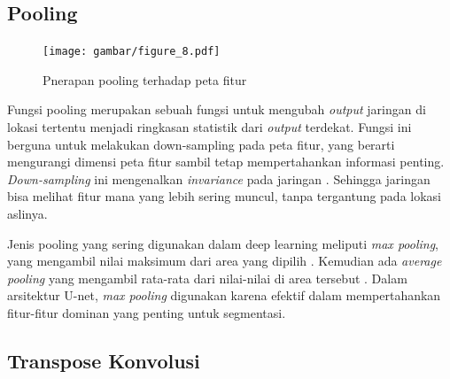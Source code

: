 \subsection{Pooling}

\begin{figure}[H]
	\centering
	\texttt{[image: gambar/figure\_8.pdf]}
	\caption{Pnerapan pooling terhadap peta fitur \cite{bishop_deep_2024}}
	\label{fig:pooling}
\end{figure}

\noindent Fungsi pooling merupakan sebuah fungsi untuk mengubah \textit{output} jaringan di lokasi tertentu menjadi ringkasan statistik dari \textit{output} terdekat\cite{goodfellow_deep_2016,bishop_deep_2024}. Fungsi ini berguna untuk melakukan down-sampling pada peta fitur, yang berarti mengurangi dimensi peta fitur sambil tetap mempertahankan informasi penting. \textit{Down-sampling} ini mengenalkan \textit{invariance} pada jaringan \cite{goodfellow_deep_2016}. Sehingga jaringan bisa melihat fitur mana yang lebih sering muncul, tanpa tergantung pada lokasi aslinya.

\noindent Jenis pooling yang sering digunakan dalam deep learning meliputi \textit{max pooling}, yang mengambil nilai maksimum dari area yang dipilih \cite{bishop_deep_2024}. Kemudian ada \textit{average pooling} yang mengambil rata-rata dari nilai-nilai di area tersebut \cite{bishop_deep_2024}. Dalam arsitektur U-net, \textit{max pooling} digunakan karena efektif dalam mempertahankan fitur-fitur dominan yang penting untuk segmentasi.

\subsection{Transpose Konvolusi}

